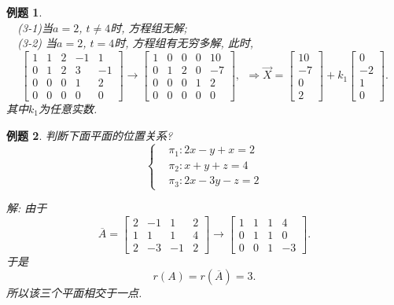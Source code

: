 \documentclass[a4paper]{book}
\newtheorem{eg}{例题}[chapter]
\begin{document}
\begin{eg}
\\ \ \ (3-1)当$a=2$, $t\not=4$时, 方程组无解;\\
\ \ (3-2) 当$a=2$, $t=4$时, 方程组有无穷多解, 此时,
\begin{displaymath}
\begin{bmatrix} 1&1&2&-1&1\\0&1&2&3&-1\\0&0&0&1&2\\0&0&0&0&0\end{bmatrix}
\rightarrow\begin{bmatrix}1&0&0&0&10\\0&1&2&0&-7\\0&0&0&1&2\\0&0&0&0&0\end{bmatrix},\ \ \Rightarrow \vec{X}=\begin{bmatrix}10\\-7\\0\\2\end{bmatrix}+k_1\begin{bmatrix}0\\-2\\1\\0\end{bmatrix}.
\end{displaymath}
其中$k_1$为任意实数.
\end{eg}


\begin{eg}
判断下面平面的位置关系?
\begin{displaymath}
\left\{\begin{aligned}
&\pi_1:2x-y+x=2\\
&\pi_2:x+y+z=4\\
&\pi_3:2x-3y-z=2\end{aligned}\right.\end{displaymath}

解: 由于
\begin{displaymath}
\overline{A}=\begin{bmatrix}2&-1&1&2\\1&1&1&4\\2&-3&-1&2\end{bmatrix}\rightarrow
\begin{bmatrix}1&1&1&4\\0&1&1&0\\0&0&1&-3\end{bmatrix}.\end{displaymath}
于是$$r(A)=r(\overline{A})=3.$$
所以该三个平面相交于一点.
\end{eg}
\end{document}
